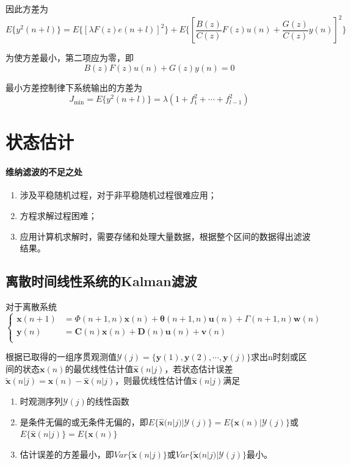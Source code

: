\documentclass[11pt,a4paper]{ctexart}
\begin{document}
        因此方差为
        \[
        E\{y^2(n+l)\}=E\{[\lambda F(z)e(n+l)]^2\}+E\{[\frac{B(z)}{C(z)}F(z)u(n)+\frac{G(z)}{C(z)}y(n)]^2\}
        \]

        为使方差最小，第二项应为零，即
        \[
        B(z)F(z)u(n)+G(z)y(n)=0
        \]

        最小方差控制律下系统输出的方差为
        \[
        J_{\min}=E\{y^2(n+l)\}=\lambda(1+f_1^2+\cdots+f_{l-1}^2)
        \]
\newpage
\section{状态估计}
    \paragraph{维纳滤波的不足之处}
    \begin{enumerate}
        \item 涉及平稳随机过程，对于非平稳随机过程很难应用；
        \item 方程求解过程困难；
        \item 应用计算机求解时，需要存储和处理大量数据，根据整个区间的数据得出滤波结果。
    \end{enumerate}
    \subsection{离散时间线性系统的Kalman滤波}
        对于离散系统
        \[
        \begin{cases}
        \bm{x}(n+1)&=\bm{\varPhi}(n+1,n)\bm{x}(n)+\bm{\theta}(n+1,n)\bm{u}(n)+\bm{\varGamma}(n+1,n)\bm{w}(n)\\
        \bm{y}(n)&=\bm{C}(n)\bm{x}(n)+\bm{D}(n)\bm{u}(n)+\bm{v}(n)\\
        \end{cases}
        \]
        
        根据已取得的一组序贯观测值$\mathscr{Y}(j)=\{\bm y(1),\bm y(2),\cdots,\bm y(j)\}$求出n时刻或区间的状态$\bm x(n)$的最优线性估计值$\bm{\hat x}(n|j)$，若状态估计误差$\bm{\tilde x}(n|j)=\bm x(n)-\bm{\hat x}(n|j)$，则最优线性估计值$\bm{\hat x}(n|j)$满足
        \begin{enumerate}
            \item 时观测序列$\mathscr{Y}(j)$的线性函数
            \item 是条件无偏的或无条件无偏的，即$E\{\bm{\hat x}(n|j)|\mathscr{Y}(j)\}=E\{\bm x(n)|\mathscr{Y}(j)\}$或$E\{\bm{\hat x}(n|j)\}=E\{\bm x(n)\}$
            \item 估计误差的方差最小，即$Var\{\bm{\tilde x}(n|j)\}$或$Var\{\bm{\tilde x}(n|j)|\mathscr{Y}(j)\}$最小。
        \end{enumerate}
\end{document}
